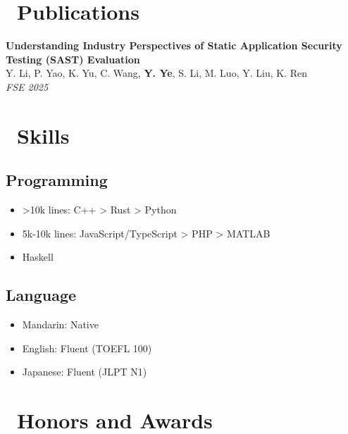 \documentclass{resume}
\begin{document}
\section{\faBookmarkO\ Publications}

\textbf{Understanding Industry Perspectives of Static Application Security Testing (SAST) Evaluation} \\
Y. Li, P. Yao, K. Yu, C. Wang, \textbf{Y. Ye}, S. Li, M. Luo, Y. Liu, K. Ren \\
\textit{FSE 2025}

\section{\faCogs\ Skills}
\subsection{\textbf{Programming}}
\begin{itemize}[itemsep=0.5ex]
  \item >10k lines: C++ > Rust > Python
  \item 5k-10k lines: JavaScript/TypeScript > PHP > MATLAB
  \item <5k lines: Java > Haskell
\end{itemize}
\subsection{\textbf{Language}}
\begin{itemize}[itemsep=0.5ex]
  \item Mandarin: Native
  \item English: Fluent (TOEFL 100)
  \item Japanese: Fluent (JLPT N1)
\end{itemize}

\section{\faHeartO\ Honors and Awards}
\end{document}
